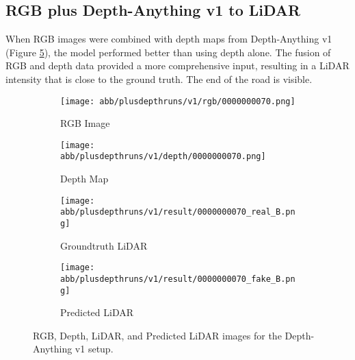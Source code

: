 \subsection{RGB plus Depth-Anything v1 to LiDAR}
When RGB images were combined with depth maps from Depth-Anything v1 (Figure \ref{v1_rgbd}), the model performed better than using depth alone. The fusion of RGB and depth data provided a more comprehensive input, resulting in a LiDAR intensity that is close to the ground truth. The end of the road is visible.
\begin{figure}[!ht]
	\centering
	\begin{subfigure}{0.4\textwidth}
		\centering
		\texttt{[image: abb/plusdepthruns/v1/rgb/0000000070.png]}
		\caption{RGB Image}
		\label{fig:v1_rgb}
	\end{subfigure}
	
	\vspace{1em} %
	
	\begin{subfigure}{0.4\textwidth}
		\centering
		\texttt{[image: abb/plusdepthruns/v1/depth/0000000070.png]}
		\caption{Depth Map}
		\label{fig:v1_depth}
	\end{subfigure}
	
	\vspace{1em} %
	
	\begin{subfigure}{0.25\textwidth}
		\centering
		\texttt{[image: abb/plusdepthruns/v1/result/0000000070\_real\_B.png]}
		\caption{Groundtruth LiDAR}
		\label{fig:v1_pred_lidar}
	\end{subfigure}
	\begin{subfigure}{0.25\textwidth}
		\centering
		\texttt{[image: abb/plusdepthruns/v1/result/0000000070\_fake\_B.png]}
		\caption{Predicted LiDAR}
		\label{fig:v1_fake_lidar}
	\end{subfigure}
	
	\caption{RGB, Depth, LiDAR, and Predicted LiDAR images for the Depth-Anything v1 setup.}
	\label{v1_rgbd}
\end{figure}
\newpage
